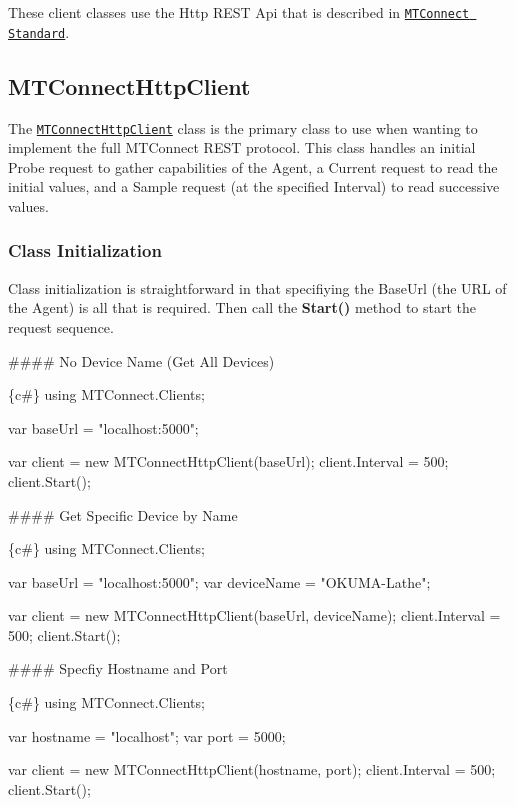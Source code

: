 These client classes use the Http R\+E\+ST Api that is described in \href{https://model.mtconnect.org/#Package__8082e379-d82e-4b0e-abad-83cdf92f7fe6}{\tt M\+T\+Connect Standard}.

\subsection*{M\+T\+Connect\+Http\+Client}

The \href{MTConnectHttpClient.cs}{\tt M\+T\+Connect\+Http\+Client} class is the primary class to use when wanting to implement the full M\+T\+Connect R\+E\+ST protocol. This class handles an initial Probe request to gather capabilities of the Agent, a Current request to read the initial values, and a Sample request (at the specified Interval) to read successive values.

\subsubsection*{Class Initialization}

Class initialization is straightforward in that specifiying the Base\+Url (the U\+RL of the Agent) is all that is required. Then call the {\bfseries Start()} method to start the request sequence.

\#\#\#\# No Device Name (Get All Devices) 
\begin{DoxyCode}
\{c#\}
using MTConnect.Clients;

var baseUrl = "localhost:5000";

var client = new MTConnectHttpClient(baseUrl);
client.Interval = 500;
client.Start();
\end{DoxyCode}


\#\#\#\# Get Specific Device by Name 
\begin{DoxyCode}
\{c#\}
using MTConnect.Clients;

var baseUrl = "localhost:5000";
var deviceName = "OKUMA-Lathe";

var client = new MTConnectHttpClient(baseUrl, deviceName);
client.Interval = 500;
client.Start();
\end{DoxyCode}


\#\#\#\# Specfiy Hostname and Port 
\begin{DoxyCode}
\{c#\}
using MTConnect.Clients;

var hostname = "localhost";
var port = 5000;

var client = new MTConnectHttpClient(hostname, port);
client.Interval = 500;
client.Start();
\end{DoxyCode}


